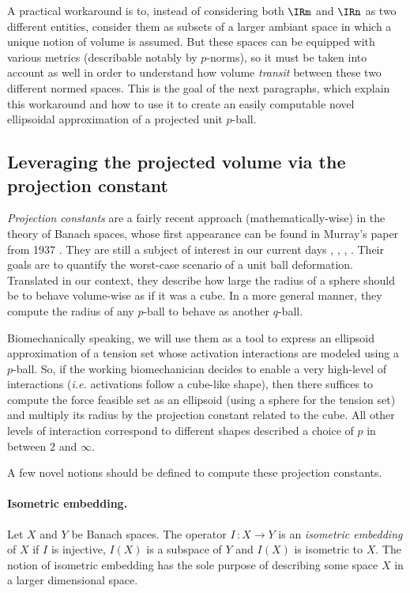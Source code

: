 A practical workaround is to, instead of considering both $\IRm$ and $\IRn$ as two different entities, consider them as subsets of a larger ambiant space in which a unique notion of volume is assumed. But these spaces can be equipped with various metrics (describable notably by $p$-norms), so it must be taken into account as well in order to understand how volume \emph{transit} between these two different normed spaces. This is the goal of the next paragraphs, which explain this workaround and how to use it to create an easily computable novel ellipsoidal approximation of a projected unit $p$-ball.

\subsection{Leveraging the projected volume via the projection constant}
\label{subsec:projection_constant}
\emph{Projection constants} are a fairly recent approach (mathematically-wise) in the theory of Banach spaces, whose first appearance can be found in Murray's paper from 1937 \cite{murrayCOMPLEMENTARYMANIFOLDSPRO}. They are still a subject of interest in our current days \cite{donohoCountingFacesRandomlyProjected2010}, \cite{foucartMaximalRelativeProjection2017}, \cite{bassoComputationMaximalProjection2019}, \cite{defantProjectionConstantsSpaces2022}. Their goals are to quantify the worst-case scenario of a unit ball deformation. Translated in our context, they describe how large the radius of a sphere should be to behave volume-wise as if it was a cube. In a more general manner, they compute the radius of any $p$-ball to behave as another $q$-ball. 

Biomechanically speaking, we will use them as a tool to express an ellipsoid approximation of a tension set whose activation interactions are modeled using a $p$-ball. So, if the working biomechanician decides to enable a very high-level of interactions (\emph{i.e.} activations follow a cube-like shape), then there suffices to compute the force feasible set as an ellipsoid (using a sphere for the tension set) and multiply its radius by the projection constant related to the cube. All other levels of interaction correspond to different shapes described a choice of $p$ in between $2$ and $\infty$.

A few novel notions should be defined to compute these projection constants.

\paragraph*{Isometric embedding.} Let $X$ and $Y$ be Banach spaces. The operator $I\,\colon X\rightarrow Y$ is an \emph{isometric embedding} of $X$ if $I$ is injective, $I(X)$ is a subspace of $Y$ and $I(X)$ is isometric to $X$. The notion of isometric embedding has the sole purpose of describing some space $X$ in a larger dimensional space.

